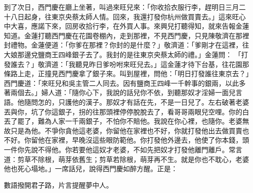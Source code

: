 \begin{showcontents}{}
到了次日，西門慶在廳上坐著，叫過來旺兒來：「你收拾衣服行李，趕明日三月二十八日起身，往東京央蔡太師人情。回來，我還打發你杭州做買賣去。」這來旺心中大喜，應諾下來，回房收拾行李，在外買人事。來興兒打聽得知，就來告報金蓮知道。金蓮打聽西門慶在花園卷棚內，走到那裡，不見西門慶，只見陳敬濟在那裡封禮物。金蓮便道：「你爹在那裡？你封的是什麼？」敬濟道：「爹剛才在這裡，往大娘那邊兌鹽商王四峰銀子去了。我封的是往東京央蔡太師的禮。」金蓮問： 「打發誰去？」敬濟道：「我聽見昨日爹吩咐來旺兒去。」這金蓮才待下台基，往花園那條路上走，正撞見西門慶拿了銀子來。叫到屋裡，問他：「明日打發誰往東京去？」西門慶道：「來旺兒和吳主管二人同去。因有鹽商王四峰一千幹事的銀兩，以此多著兩個去。」婦人道：「隨你心下，我說的話兒你不依，到聽那奴才淫婦一面兒言語。他隨問怎的，只護他的漢子。那奴才有話在先，不是一日兒了。左右破著老婆丟與你，坑了你這銀子，拐的往那頭裡停停脫脫去了，看哥哥兩眼兒空哩。你的白丟了罷了，難為人家一千兩銀子，不怕你不賠他。我說在你心裡，也隨你。老婆無故只是為他。不爭你貪他這老婆，你留他在家裡也不好，你就打發他出去做買賣也不好。你留他在家裡，早晚沒這些眼防範他。你打發他外邊去，他使了你本錢，頭一件你先說不得他。你若要他這奴才老婆，不如先把奴才打發他離門離戶。常言道：剪草不除根，萌芽依舊生；剪草若除根，萌芽再不生。就是你也不耽心，老婆他也死心塌地。」一席話兒，說得西門慶如醉方醒。正是：

數語撥開君子路，片言提醒夢中人。



\end{showcontents}

